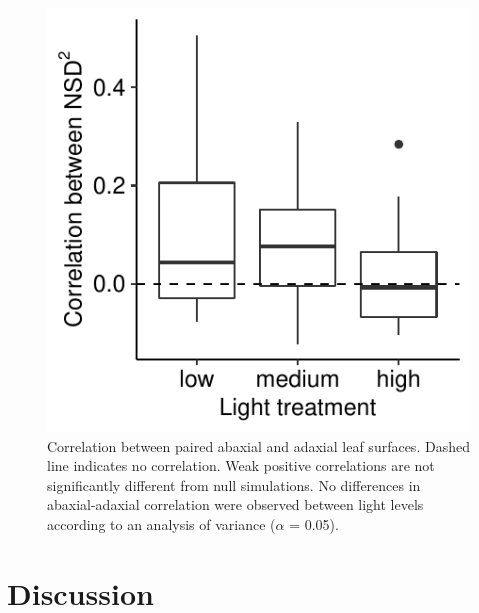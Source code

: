 \documentclass[12pt,halfline,a4paper,]{ouparticle}
\begin{document}
\begin{figure}[ht]
\includegraphics[width = \textwidth]{figures/dual-surface.pdf}
\caption{Correlation between paired abaxial and adaxial leaf surfaces. Dashed line indicates no correlation. Weak positive correlations are not significantly different from null simulations. No differences in abaxial-adaxial correlation were observed between light levels according to an analysis of variance ($\alpha$ = 0.05).}
\label{fig:dual-surface}
\end{figure}

\hypertarget{discussion}{%
\section{Discussion}\label{discussion}}
\end{document}
